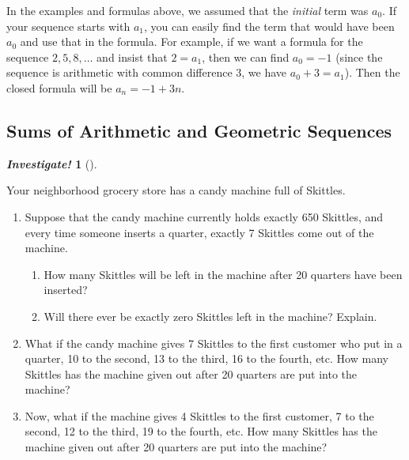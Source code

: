 \documentclass[10pt,]{book}
\theoremstyle{plain}
\theoremstyle{definition}
\theoremstyle{definition}
\newtheorem{investigation}[project]{\emph{Investigate!}}
\theoremstyle{definition}
\numberwithin{equation}{chapter}
\begin{document}
      In the examples and formulas above, we assumed that the \emph{initial} term was \(a_0\). If your sequence starts with \(a_1\), you can easily find the term that would have been \(a_0\) and use that in the formula. For example, if we want a formula for the sequence \(2, 5, 8,\ldots\) and insist that \(2= a_1\), then we can find \(a_0 = -1\) (since the sequence is arithmetic with common difference 3, we have \(a_0 + 3 = a_1\)). Then the closed formula will be \(a_n = -1 + 3n\).
\typeout{************************************************}
\typeout{************************************************}
\subsection[Sums of Arithmetic and Geometric Sequences]{Sums of Arithmetic and Geometric Sequences}\label{subsection-21}
\begin{investigation}[]\label{investigation-19}

          Your neighborhood grocery store has a candy machine full of Skittles.
\leavevmode%
\begin{enumerate}
\item\hypertarget{li-880}{}
                  Suppose that the candy machine currently holds exactly 650 Skittles, and every time someone inserts a quarter, exactly 7 Skittles come out of the machine.

\begin{enumerate}
\item\hypertarget{li-881}{}
                    How many Skittles will be left in the machine after 20 quarters have been inserted?
\item\hypertarget{li-882}{}
                    Will there ever be exactly zero Skittles left in the machine? Explain.
\end{enumerate}

\item\hypertarget{li-883}{}
                What if the candy machine gives 7 Skittles to the first customer who put in a quarter, 10 to the second, 13 to the third, 16 to the fourth, etc. How many Skittles has the machine given out after 20 quarters are put into the machine?
\item\hypertarget{li-884}{}
                Now, what if the machine gives 4 Skittles to the first customer, 7 to the second, 12 to the third, 19 to the fourth, etc. How many Skittles has the machine given out after 20 quarters are put into the machine?
\end{enumerate}

%
\end{investigation}
\end{document}
